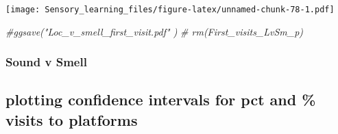 \documentclass[]{article}
\newenvironment{Shaded}{\begin{snugshade}}{\end{snugshade}}
\newcommand{\CommentTok}[1]{\textcolor[rgb]{0.56,0.35,0.01}{\textit{{#1}}}}
\begin{document}
\texttt{[image: Sensory\_learning\_files/figure-latex/unnamed-chunk-78-1.pdf]}

\begin{Shaded}
\begin{Highlighting}[]
  \CommentTok{#ggsave("Loc_v_smell_first_visit.pdf"  )}
 \CommentTok{# rm(First_visits_LvSm_p)}
\end{Highlighting}
\end{Shaded}

\subsubsection{Sound v Smell}\label{sound-v-smell-2}

\subsection{plotting confidence intervals for pct and \% visits to
platforms}\label{plotting-confidence-intervals-for-pct-and-visits-to-platforms-2}
\end{document}
